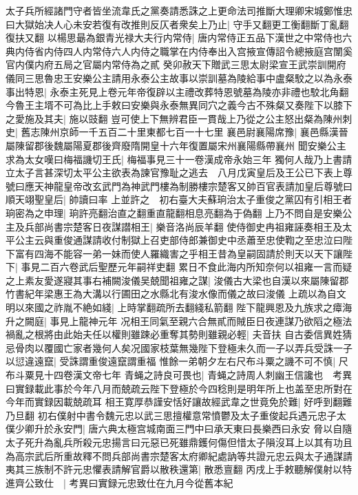 太子兵所經諸門守者皆坐流韋氏之黨奏請悉誅之上更命法司推斷大理卿宋城鄭惟忠曰大獄始决人心未安若復有改推則反仄者衆矣上乃止|{
	守手又翻更工衡翻斷丁亂翻復扶又翻}
以楊思朂為銀青光禄大夫行内常侍|{
	唐内常侍正五品下漢世之中常侍也六典内侍省内侍四人内常侍六人内侍之職掌在内侍奉出入宫掖宣傳詔令總掖庭宫闈奚官内僕内府五局之官屬内常侍為之貳}
癸卯赦天下贈武三思太尉梁宣王武崇訓開府儀同三思魯忠王安樂公主請用永泰公主故事以崇訓墓為陵給事中盧粲駮之以為永泰事出特恩|{
	永泰主死見上卷元年帝復辟以主禮改葬特恩號墓為陵亦非禮也駮北角翻}
今魯王主壻不可為比上手敕曰安樂與永泰無異同穴之義今古不殊粲又奏陛下以膝下之愛施及其夫|{
	施以豉翻}
豈可使上下無辨君臣一貫哉上乃從之公主怒出粲為陳州刺史|{
	舊志陳州京師一千五百二十里東都七百一十七里}
襄邑尉襄陽席豫|{
	襄邑縣漢晉屬陳留郡後魏屬陽夏郡後齊廢隋開皇十六年復置屬宋州襄陽縣帶襄州}
聞安樂公主求為太女嘆曰梅福譏切王氏|{
	梅福事見三十一卷漢成帝永始三年}
獨何人哉乃上書請立太子言甚深切太平公主欲表為諫官豫耻之逃去　八月戊寅皇后及王公已下表上尊號曰應天神龍皇帝改玄武門為神武門樓為制勝樓宗楚客又帥百官表請加皇后尊號曰順天翊聖皇后|{
	帥讀曰率}
上並許之　初右臺大夫蘇珦治太子重俊之黨囚有引相王者珦密為之申理|{
	珦許亮翻治直之翻重直龍翻相息亮翻為于偽翻}
上乃不問自是安樂公主及兵部尚書宗楚客日夜謀譛相王|{
	樂音洛尚辰羊翻}
使侍御史冉祖雍誣奏相王及太平公主云與重俊通謀請收付制獄上召吏部侍郎兼御史中丞蕭至忠使鞫之至忠泣曰陛下富有四海不能容一弟一妹而使人羅織害之乎相王昔為皇嗣固請於則天以天下讓陛下|{
	事見二百六卷武后聖歷元年嗣祥吏翻}
累日不食此海内所知奈何以祖雍一言而疑之上素友愛遂寢其事右補闕浚儀吴兢聞祖雍之謀|{
	浚儀古大梁也自漢以來屬陳留郡竹書紀年梁惠王為大溝以行圃田之水縣北有浚水像而儀之故曰浚儀}
上疏以為自文明以來國之祚胤不絶如綫|{
	上時掌翻疏所去翻綫私箭翻}
陛下龍興恩及九族求之瘴海升之闕庭|{
	事見上龍神元年}
况相王同氣至親六合無貳而賊臣日夜連謀乃欲䧟之極法禍亂之根將由此始夫任以權則雖踈必重奪其勢則雖親必輕|{
	夫音扶}
自古委信異姓猜忌骨肉以覆國亡家者幾何人矣况國家枝葉無幾陛下登極未久而一子以弄兵受誅一子以愆違遠竄|{
	受誅謂重俊遠竄謂重福}
惟餘一弟朝夕左右尺布斗粟之譏不可不慎|{
	尺布斗粟見十四卷漢文帝七年}
青蝇之詩良可畏也|{
	青蝇之詩周人刺幽王信讒也　考異曰實録載此事於今年八月而兢疏云陛下登極於今四稔則是明年所上也盖至忠所對在今年而實録因載兢疏耳}
相王寛厚恭謹安恬好讓故經武韋之世竟免於難|{
	好呼到翻難乃旦翻}
初右僕射中書令魏元忠以武三思擅權意常憤鬱及太子重俊起兵遇元忠子太僕少卿升於永安門|{
	唐六典太極宫城南面三門中曰承天東曰長樂西曰永安}
脅以自隨太子死升為亂兵所殺元忠揚言曰元惡已死雖鼎鑊何傷但惜太子隕沒耳上以其有功且為高宗武后所重故釋不問兵部尚書宗楚客太府卿紀處訥等共證元忠云與太子通謀請夷其三族制不許元忠懼表請解官爵以散秩還第|{
	散悉亶翻}
丙戌上手敕聽解僕射以特進齊公致仕　|{
	考異曰實録元忠致仕在九月今從舊本紀}
